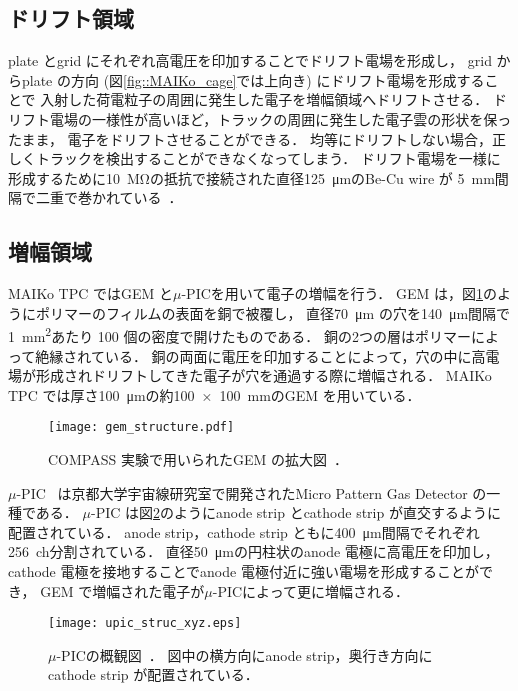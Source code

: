 \documentclass[../master]{subfiles}
\begin{document}
\subsection{ドリフト領域}
plate とgrid にそれぞれ高電圧を印加することでドリフト電場を形成し，
grid からplate の方向 (図\ref{fig::MAIKo_cage}では上向き) にドリフト電場を形成することで
入射した荷電粒子の周囲に発生した電子を増幅領域へドリフトさせる．
ドリフト電場の一様性が高いほど，トラックの周囲に発生した電子雲の形状を保ったまま，
電子をドリフトさせることができる．
均等にドリフトしない場合，正しくトラックを検出することができなくなってしまう．
ドリフト電場を一様に形成するために\SI{10}{\mega\ohm}の抵抗で接続された直径\SI{125}{\micro\metre}のBe-Cu wire が
\SI{5}{\milli\metre}間隔で二重で巻かれている~\cite{furuno}．

\subsection{増幅領域}
MAIKo TPC ではGEM と$\mu$-PICを用いて電子の増幅を行う．
GEM は，図\ref{pic::GEM}のようにポリマーのフィルムの表面を銅で被覆し，
直径\SI{70}{\micro\metre} の穴を\SI{140}{\micro\metre}間隔で\SI{1}{\square\milli\metre}あたり
100 個の密度で開けたものである．
銅の2つの層はポリマーによって絶縁されている．
銅の両面に電圧を印加することによって，穴の中に高電場が形成されドリフトしてきた電子が穴を通過する際に増幅される．
MAIKo TPC では厚さ\SI{100}{\micro\metre}の約\SI{100x100}{\milli\metre}のGEM を用いている．
\begin{figure}
  \centering
  \texttt{[image: gem\_structure.pdf]}
  \caption{COMPASS 実験で用いられたGEM の拡大図~\cite{gem_compass}．}
  \label{pic::GEM}  
\end{figure}

$\mu$-PIC~\cite{mupic} は京都大学宇宙線研究室で開発されたMicro Pattern Gas Detector の一種である．
$\mu$-PIC は図\ref{fig::mupic}のようにanode strip とcathode strip が直交するように配置されている．
anode strip，cathode strip ともに\SI{400}{\micro\metre}間隔でそれぞれ256~ch分割されている．
直径\SI{50}{\micro\metre}の円柱状のanode 電極に高電圧を印加し，
cathode 電極を接地することでanode 電極付近に強い電場を形成することができ，
GEM で増幅された電子が$\mu$-PICによって更に増幅される．
\begin{figure}
  \centering
  \texttt{[image: upic\_struc\_xyz.eps]}
  \caption[$\mu$-PICの概観図．]{$\mu$-PICの概観図~\cite{mupic}．
    図中の横方向にanode strip，奥行き方向にcathode strip が配置されている．
  }
  \label{fig::mupic}
\end{figure}
\end{document}
